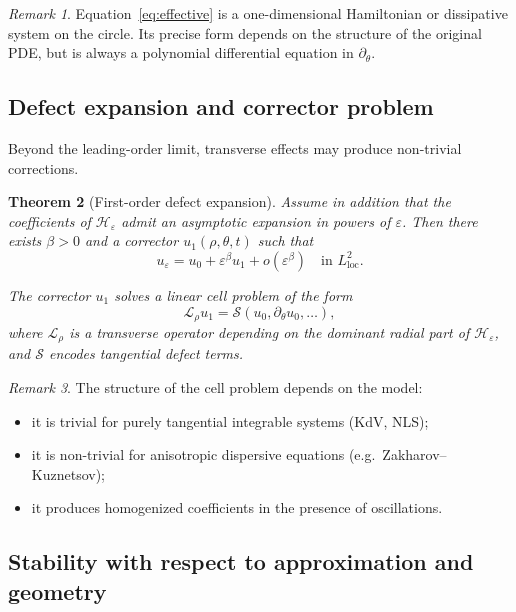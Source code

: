 \documentclass[11pt]{amsart}
\theoremstyle{plain}
\newtheorem{theorem}{Theorem}[section]
\theoremstyle{definition}
\theoremstyle{remark}
\newtheorem{remark}[theorem]{Remark}
\theoremstyle{remark}
\begin{document}
\begin{remark}
Equation~\eqref{eq:effective} is a one-dimensional Hamiltonian or dissipative
system on the circle.
Its precise form depends on the structure of the original PDE, but is always a
polynomial differential equation in $\partial_\theta$.
\end{remark}

\subsection{Defect expansion and corrector problem}

Beyond the leading-order limit, transverse effects may produce non-trivial
corrections.

\begin{theorem}[First-order defect expansion]
\label{thm:defect}
Assume in addition that the coefficients of $\mathcal H_\varepsilon$ admit an
asymptotic expansion in powers of $\varepsilon$.
Then there exists $\beta>0$ and a corrector $u_1(\rho,\theta,t)$ such that
\[
u_\varepsilon
=
u_0 + \varepsilon^\beta u_1 + o(\varepsilon^\beta)
\quad\text{in }L^2_{\mathrm{loc}}.
\]

The corrector $u_1$ solves a linear cell problem of the form
\[
\mathcal L_\rho u_1
=
\mathcal S(u_0,\partial_\theta u_0,\ldots),
\]
where $\mathcal L_\rho$ is a transverse operator depending on the dominant
radial part of $\mathcal H_\varepsilon$, and $\mathcal S$ encodes tangential
defect terms.
\end{theorem}

\begin{remark}
The structure of the cell problem depends on the model:
\begin{itemize}
\item it is trivial for purely tangential integrable systems (KdV, NLS);
\item it is non-trivial for anisotropic dispersive equations
(e.g.\ Zakharov--Kuznetsov);
\item it produces homogenized coefficients in the presence of oscillations.
\end{itemize}
\end{remark}

\subsection{Stability with respect to approximation and geometry}
\end{document}
